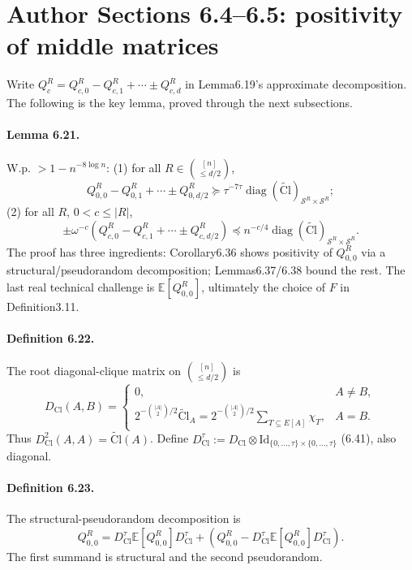 \section*{Author Sections 6.4--6.5: positivity of middle matrices}
Write $Q_c^R=Q_{c,0}^R-Q_{c,1}^R+\cdots\pm Q_{c,d}^R$ in Lemma6.19's approximate decomposition. The following is the key lemma, proved through the next subsections.
\paragraph{Lemma 6.21.} W.p. $>1-n^{-8\log n}$: (1) for all $R\in\binom{[n]}{\le d/2}$,
\[Q_{0,0}^R-Q_{0,1}^R+\cdots\pm Q_{0,d/2}^R\succeq\tau^{-7\tau}\operatorname{diag}(\widetilde{\mathrm{Cl}})_{\mathcal S^R\times\mathcal S^R};\]
(2) for all $R$, $0<c\le|R|$,
\[\pm\omega^{-c}(Q_{c,0}^R-Q_{c,1}^R+\cdots\pm Q_{c,d/2}^R)\preceq n^{-c/4}\operatorname{diag}(\widetilde{\mathrm{Cl}})_{\mathcal S^R\times\mathcal S^R}.\]
The proof has three ingredients: Corollary6.36 shows positivity of $Q_{0,0}^R$ via a structural/pseudorandom decomposition; Lemmas6.37/6.38 bound the rest. The last real technical challenge is $\mathbb E[Q_{0,0}^R]$, ultimately the choice of $F$ in Definition3.11.
\paragraph{Definition 6.22.} The root diagonal-clique matrix on $\binom{[n]}{\le d/2}$ is
\[D_{\mathrm{Cl}}(A,B)=\begin{cases}0,&A\ne B,\\2^{-\binom{|A|}2/2}\widetilde{\mathrm{Cl}}_A=2^{-\binom{|A|}2/2}\sum_{T\subseteq E[A]}\chi_T,&A=B.\end{cases}\tag{6.40}\]
Thus $D_{\mathrm{Cl}}^2(A,A)=\widetilde{\mathrm{Cl}}(A)$. Define $D_{\mathrm{Cl}}^\tau:=D_{\mathrm{Cl}}\otimes\mathrm{Id}_{\{0,\ldots,\tau\}\times\{0,\ldots,\tau\}}$ (6.41), also diagonal.
\paragraph{Definition 6.23.} The structural-pseudorandom decomposition is
\[Q_{0,0}^R=D_{\mathrm{Cl}}^\tau\mathbb E[Q_{0,0}^R]D_{\mathrm{Cl}}^\tau+\left(Q_{0,0}^R-D_{\mathrm{Cl}}^\tau\mathbb E[Q_{0,0}^R]D_{\mathrm{Cl}}^\tau\right).\tag{6.42}\]
The first summand is structural and the second pseudorandom.
